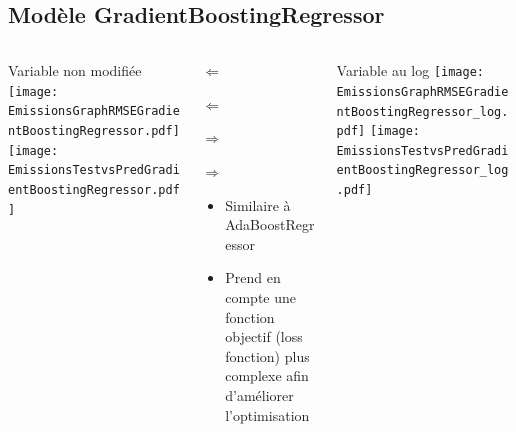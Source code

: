 \documentclass[8pt,aspectratio=169,hyperref={unicode=true}]{beamer}
\begin{document}
\subsection{Modèle GradientBoostingRegressor}
\begin{frame}{\insertsubsection}
  \begin{columns}[t]
    \begin{column}{.33\textwidth}
      \centering Variable non modifiée
      \texttt{[image: EmissionsGraphRMSEGradientBoostingRegressor.pdf]}
      \texttt{[image: EmissionsTestvsPredGradientBoostingRegressor.pdf]}
    \end{column}
    \begin{column}{.33\textwidth}
      $\Longleftarrow$
      \scriptsize
      {\centering
        }
      

      \normalsize
      $\Longleftarrow$

      \raggedleft $\Longrightarrow$
      \scriptsize
      {\centering
        }
      

      \normalsize
      $\Longrightarrow$

      \raggedright
      \begin{itemize}
        \item Similaire à AdaBoostRegressor
        \item Prend en compte une fonction objectif (loss fonction) plus complexe afin
              d'améliorer l'optimisation
      \end{itemize}
    \end{column}
    \begin{column}{.33\textwidth}
      \centering Variable au log
      \texttt{[image: EmissionsGraphRMSEGradientBoostingRegressor\_log.pdf]}
      \texttt{[image: EmissionsTestvsPredGradientBoostingRegressor\_log.pdf]}
    \end{column}
  \end{columns}
\end{frame}
\end{document}
